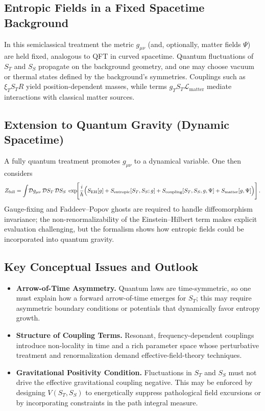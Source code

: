 \documentclass[11pt,a4paper]{article} %
\begin{document}
\subsection{Entropic Fields in a Fixed Spacetime Background}
In this semiclassical treatment the metric \(g_{\mu\nu}\) (and, optionally, matter fields \(\Psi\)) are held fixed, analogous to QFT in curved spacetime.  Quantum fluctuations of \(S_T\) and \(S_S\) propagate on the background geometry, and one may choose vacuum or thermal states defined by the background’s symmetries.  Couplings such as \(\xi_T S_T R\) yield position-dependent masses, while terms \(g_T S_T\mathcal{L}_{\mathrm{matter}}\) mediate interactions with classical matter sources.

\subsection{Extension to Quantum Gravity (Dynamic Spacetime)}
A fully quantum treatment promotes \(g_{\mu\nu}\) to a dynamical variable.  One then considers
\begin{equation}
Z_{\mathrm{full}}
=\int\!\mathcal{D}g_{\mu\nu}\,\mathcal{D}S_T\,\mathcal{D}S_S\;\exp\!\Biggl[\frac{i}{\hbar}
\Bigl(S_{\mathrm{EH}}[g]+S_{\mathrm{entropic}}[S_T,S_S;g]
+S_{\mathrm{coupling}}[S_T,S_S,g,\Psi]
+S_{\mathrm{matter}}[g,\Psi]\Bigr)\Biggr]\,.
\end{equation}
Gauge-fixing and Faddeev–Popov ghosts are required to handle diffeomorphism invariance; the non-renormalizability of the Einstein–Hilbert term makes explicit evaluation challenging, but the formalism shows how entropic fields could be incorporated into quantum gravity.

\subsection{Key Conceptual Issues and Outlook}
\begin{itemize}
  \item \textbf{Arrow-of-Time Asymmetry.}  Quantum laws are time-symmetric, so one must explain how a forward arrow-of-time emerges for \(S_T\); this may require asymmetric boundary conditions or potentials that dynamically favor entropy growth.
  \item \textbf{Structure of Coupling Terms.}  Resonant, frequency-dependent couplings introduce non-locality in time and a rich parameter space whose perturbative treatment and renormalization demand effective-field-theory techniques.
  \item \textbf{Gravitational Positivity Condition.}  Fluctuations in \(S_T\) and \(S_S\) must not drive the effective gravitational coupling negative.  This may be enforced by designing \(V(S_T,S_S)\) to energetically suppress pathological field excursions or by incorporating constraints in the path integral measure.
\end{itemize}
\end{document}
